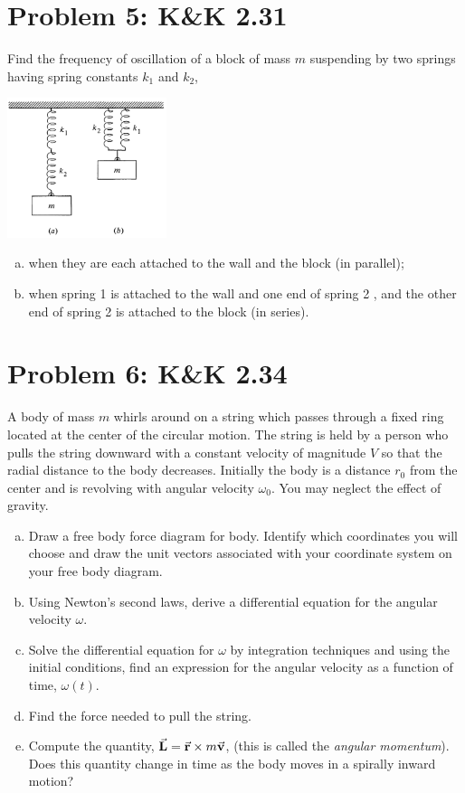 \documentclass[problems]{esg8012pset}
\begin{document}
\section*{Problem 5: K\&K 2.31}
  Find the frequency of oscillation of a block of mass $m$ suspending by two springs having spring constants $k_1$ and $k_2$,
  \begin{center}\includegraphics[width=0.35\textwidth]{ps03_4}\end{center}
  \begin{enumerate}[a)]
    \item when they are each attached to the wall and the block (in parallel);
    \item when spring 1 is attached to the wall and one end of spring 2 , and the other end of spring 2 is attached to the block (in series).
  \end{enumerate}
\section*{Problem 6: K\&K 2.34}
  A body of mass $m$ whirls around on a string which passes through a fixed ring located at the center of the circular motion. The string is held by a person who pulls the string downward with a constant velocity of magnitude $V$ so that the radial distance to the body decreases. Initially the body is a distance $r_0$ from the center and is revolving
with angular velocity $\omega_0$. You may neglect the effect of gravity.
  \begin{enumerate}[a)]
    \item Draw a free body force diagram for body. Identify which coordinates you will choose and draw the unit vectors associated with your coordinate system on your free body diagram.
    \item Using Newton's second laws, derive a differential equation for the angular velocity $\omega$.
    \item Solve the differential equation for $\omega$ by integration techniques and using the initial conditions, find an expression for the angular velocity as a function of time, $\omega(t)$.
    \item Find the force needed to pull the string.
    \item Compute the quantity, $\vec{\bf{L}} = \vec{\bf{r}}\times m\vec{\bf{v}}$, (this is called the \emph{angular momentum}). Does this quantity change in time as the body moves in a spirally inward motion?
  \end{enumerate}
\end{document}
